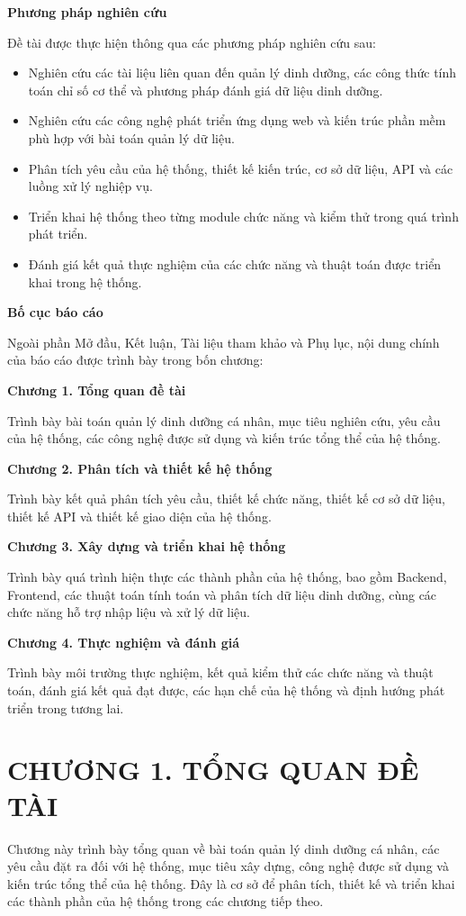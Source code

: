 \textbf{Phương pháp nghiên cứu}

Đề tài được thực hiện thông qua các phương pháp nghiên cứu sau:

\begin{itemize}
\item Nghiên cứu các tài liệu liên quan đến quản lý dinh dưỡng, các công thức tính toán chỉ số cơ thể và phương pháp đánh giá dữ liệu dinh dưỡng.
\item Nghiên cứu các công nghệ phát triển ứng dụng web và kiến trúc phần mềm phù hợp với bài toán quản lý dữ liệu.
\item Phân tích yêu cầu của hệ thống, thiết kế kiến trúc, cơ sở dữ liệu, API và các luồng xử lý nghiệp vụ.
\item Triển khai hệ thống theo từng module chức năng và kiểm thử trong quá trình phát triển.
\item Đánh giá kết quả thực nghiệm của các chức năng và thuật toán được triển khai trong hệ thống.
\end{itemize}
\textbf{Bố cục báo cáo}

Ngoài phần Mở đầu, Kết luận, Tài liệu tham khảo và Phụ lục, nội dung chính của báo cáo được trình bày trong bốn chương:

\textbf{Chương 1. Tổng quan đề tài}

Trình bày bài toán quản lý dinh dưỡng cá nhân, mục tiêu nghiên cứu, yêu cầu của hệ thống, các công nghệ được sử dụng và kiến trúc tổng thể của hệ thống.

\textbf{Chương 2. Phân tích và thiết kế hệ thống}

Trình bày kết quả phân tích yêu cầu, thiết kế chức năng, thiết kế cơ sở dữ liệu, thiết kế API và thiết kế giao diện của hệ thống.

\textbf{Chương 3. Xây dựng và triển khai hệ thống}

Trình bày quá trình hiện thực các thành phần của hệ thống, bao gồm Backend, Frontend, các thuật toán tính toán và phân tích dữ liệu dinh dưỡng, cùng các chức năng hỗ trợ nhập liệu và xử lý dữ liệu.

\textbf{Chương 4. Thực nghiệm và đánh giá}

Trình bày môi trường thực nghiệm, kết quả kiểm thử các chức năng và thuật toán, đánh giá kết quả đạt được, các hạn chế của hệ thống và định hướng phát triển trong tương lai.


\chapter*{CHƯƠNG 1. TỔNG QUAN ĐỀ TÀI}
Chương này trình bày tổng quan về bài toán quản lý dinh dưỡng cá nhân, các yêu cầu đặt ra đối với hệ thống, mục tiêu xây dựng, công nghệ được sử dụng và kiến trúc tổng thể của hệ thống. Đây là cơ sở để phân tích, thiết kế và triển khai các thành phần của hệ thống trong các chương tiếp theo.

